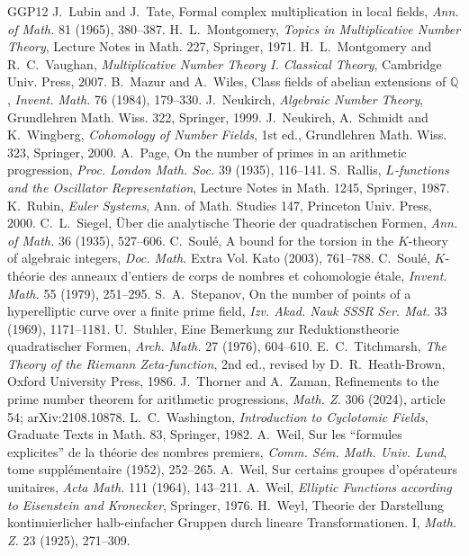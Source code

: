 \documentclass[11pt,letterpaper]{article}
\begin{document}
\begin{thebibliography}{GGP12}
 J.~Lubin and J.~Tate, Formal complex multiplication in local fields, \emph{Ann. of Math.} 81 (1965), 380--387.
 H.~L.~Montgomery, \emph{Topics in Multiplicative Number Theory}, Lecture Notes in Math. 227, Springer, 1971.
 H.~L.~Montgomery and R.~C.~Vaughan, \emph{Multiplicative Number Theory I. Classical Theory}, Cambridge Univ. Press, 2007.
 B.~Mazur and A.~Wiles, Class fields of abelian extensions of $\mathbb Q$, \emph{Invent. Math.} 76 (1984), 179--330.
 J.~Neukirch, \emph{Algebraic Number Theory}, Grundlehren Math. Wiss. 322, Springer, 1999.
 J.~Neukirch, A.~Schmidt and K.~Wingberg, \emph{Cohomology of Number Fields}, 1st ed., Grundlehren Math. Wiss. 323, Springer, 2000.
 A.~Page, On the number of primes in an arithmetic progression, \emph{Proc. London Math. Soc.} 39 (1935), 116--141.
 S.~Rallis, \emph{$L$-functions and the Oscillator Representation}, Lecture Notes in Math. 1245, Springer, 1987.
 K.~Rubin, \emph{Euler Systems}, Ann. of Math. Studies 147, Princeton Univ. Press, 2000.
 C.~L.~Siegel, \"Uber die analytische Theorie der quadratischen Formen, \emph{Ann. of Math.} 36 (1935), 527--606.
 C.~Soul\'e, A bound for the torsion in the $K$-theory of algebraic integers, \emph{Doc. Math.} Extra Vol. Kato (2003), 761--788.
 C.~Soul\'e, $K$-th\'eorie des anneaux d'entiers de corps de nombres et cohomologie \'etale, \emph{Invent. Math.} 55 (1979), 251--295.
 S.~A.~Stepanov, On the number of points of a hyperelliptic curve over a finite prime field, \emph{Izv. Akad. Nauk SSSR Ser. Mat.} 33 (1969), 1171--1181.
 U.~Stuhler, Eine Bemerkung zur Reduktionstheorie quadratischer Formen, \emph{Arch. Math.} 27 (1976), 604--610.
 E.~C.~Titchmarsh, \emph{The Theory of the Riemann Zeta-function}, 2nd ed., revised by D.~R.~Heath-Brown, Oxford University Press, 1986.
 J.~Thorner and A.~Zaman, Refinements to the prime number theorem for arithmetic progressions, \emph{Math. Z.} 306 (2024), article 54; arXiv:2108.10878.
 L.~C.~Washington, \emph{Introduction to Cyclotomic Fields}, Graduate Texts in Math. 83, Springer, 1982.
 A.~Weil, Sur les ``formules explicites'' de la th\'eorie des nombres premiers, \emph{Comm. S\'em. Math. Univ. Lund}, tome suppl\'ementaire (1952), 252--265.
 A.~Weil, Sur certains groupes d'op\'erateurs unitaires, \emph{Acta Math.} 111 (1964), 143--211.
 A.~Weil, \emph{Elliptic Functions according to Eisenstein and Kronecker}, Springer, 1976.
 H.~Weyl, Theorie der Darstellung kontinuierlicher halb-einfacher Gruppen durch lineare Transformationen. I, \emph{Math. Z.} 23 (1925), 271--309.
\end{thebibliography}
\end{document}

